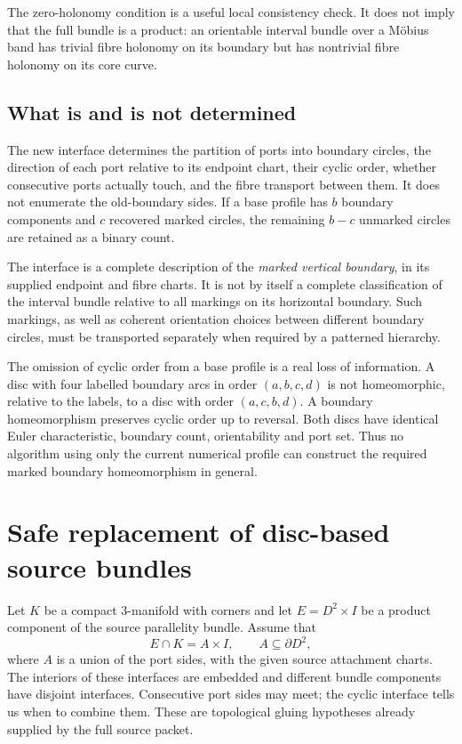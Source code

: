 The zero-holonomy condition is a useful local consistency check.  It does
not imply that the full bundle is a product: an orientable interval bundle
over a M\"obius band has trivial fibre holonomy on its boundary but has
nontrivial fibre holonomy on its core curve.

\subsection{What is and is not determined}

The new interface determines the partition of ports into boundary circles,
the direction of each port relative to its endpoint chart, their cyclic
order, whether consecutive ports actually touch, and the fibre transport
between them.  It does not enumerate the old-boundary sides.  If a base
profile has $b$ boundary components and $c$ recovered marked circles, the
remaining $b-c$ unmarked circles are retained as a binary count.

The interface is a complete description of the \emph{marked vertical
boundary}, in its supplied endpoint and fibre charts.  It is not by itself
a complete classification of the interval bundle relative to all markings
on its horizontal boundary.  Such markings, as well as coherent orientation
choices between different boundary circles, must be transported separately
when required by a patterned hierarchy.

The omission of cyclic order from a base profile is a real loss of
information.  A disc with four labelled boundary arcs in order
$(a,b,c,d)$ is not homeomorphic, relative to the labels, to a disc with
order $(a,c,b,d)$.  A boundary homeomorphism preserves cyclic order up to
reversal.  Both discs have identical Euler characteristic, boundary
count, orientability and port set.  Thus no algorithm using only the
current numerical profile can construct the required marked boundary
homeomorphism in general.

\section{Safe replacement of disc-based source bundles}
\label{sec:disc-bundle-replacement}

Let $K$ be a compact 3-manifold with corners and let
$E=D^2\times I$ be a product component of the source parallelity bundle.
Assume that
\[
              E\cap K=A\times I,
              \qquad A\subseteq\partial D^2,
\]
where $A$ is a union of the port sides, with the given source attachment
charts.  The interiors of these interfaces are embedded and different
bundle components have disjoint interfaces.  Consecutive port sides may
meet; the cyclic interface tells us when to combine them.  These are
topological gluing hypotheses already supplied by the full source packet.

